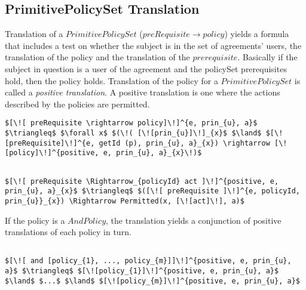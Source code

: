 \subsection{PrimitivePolicySet Translation}
Translation of a $PrimitivePolicySet$ ($preRequisite \rightarrow policy$) yields a formula that includes a test on whether the subject is in the set of agreements' users, the translation of the policy and the translation of the $prerequisite$. Basically if the subject in question is a user of the agreement and the policySet prerequisites hold, then the policy holds. Translation of the policy for a $PrimitivePolicySet$ is called a \emph{positive translation}. A positive translation is one where the actions described by the policies are permitted.   

\lstset{mathescape, language=AST}  
\begin{lstlisting}[frame=single, caption={Policy Set Translation {$\colon$} PrimitivePolicySet},label={lst:transpolicyformulaPrimitivePolicySet}]
$[\![ preRequisite \rightarrow policy]\!]^{e, prin_{u}, a}$ $\triangleq$ $\forall x$ $(\!( [\![prin_{u}]\!]_{x}$ $\land$ $[\![preRequisite]\!]^{e, getId (p), prin_{u}, a}_{x}) \rightarrow [\![policy]\!]^{positive, e, prin_{u}, a}_{x}\!)$
\end{lstlisting}



\lstset{mathescape, language=AST} 
\begin{lstlisting}[frame=single, caption={Positive Policy Translation {$\colon$} Single policy},label={lst:transpolicypositiveSingle}]

$[\![ preRequisite \Rightarrow_{policyId} act ]\!]^{positive, e, prin_{u}, a}_{x}$ $\triangleq$ $([\![ preRequisite ]\!]^{e, policyId, prin_{u}}_{x}) \Rightarrow Permitted(x, [\![act]\!], a)$

\end{lstlisting}


If the policy is a $AndPolicy$, the translation yields a conjunction of positive translations of each policy in turn.

\lstset{mathescape, language=AST}  
\begin{lstlisting}[frame=single, caption={Positive Policy Translation {$\colon$} List of policies},label={lst:transpolicypositiveListOfPolicies}]

$[\![ and [policy_{1}, ..., policy_{m}]]\!]^{positive, e, prin_{u}, a}$ $\triangleq$ $[\![policy_{1}]\!]^{positive, e, prin_{u}, a}$ $\land$ $...$ $\land$ $[\![policy_{m}]\!]^{positive, e, prin_{u}, a}$

\end{lstlisting}


